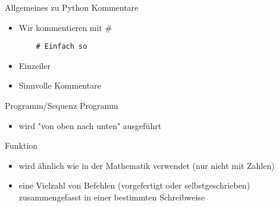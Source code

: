 \begin{frame}[fragile]{Allgemeines zu Python}
Kommentare
\begin{itemize}
	\item Wir kommentieren mit \#
	
	\begin{lstlisting}
	# Einfach so
	\end{lstlisting}

	\item Einzeiler
	\item Sinnvolle Kommentare
\end{itemize}
\end{frame}

\begin{frame}{Programm/Sequenz}
Programm
\begin{itemize}
	\item wird "von oben nach unten" ausgeführt
\end{itemize}
\end{frame}

\begin{frame}{Funktion}
	\begin{itemize}
	\item wird ähnlich wie in der Mathematik verwendet (nur nicht mit Zahlen)
	\item eine Vielzahl von Befehlen (vorgefertigt oder selbstgeschrieben) zusammengefasst in einer bestimmten Schreibweise	
	\end{itemize}
\end{frame}